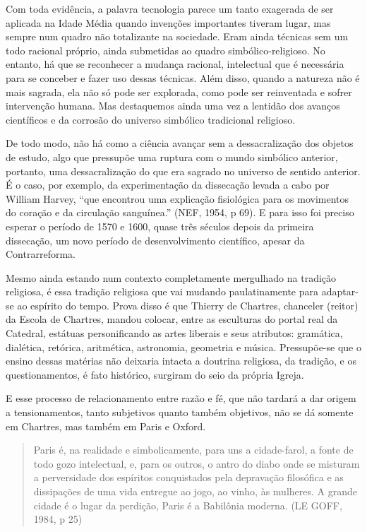 Com toda evidência, a palavra tecnologia parece um tanto exagerada de
ser aplicada na Idade Média quando invenções importantes tiveram lugar,
mas sempre num quadro não totalizante na sociedade. Eram ainda técnicas
sem um todo racional próprio, ainda submetidas ao quadro
simbólico-religioso. No entanto, há que se reconhecer a mudança
racional, intelectual que é necessária para se conceber e fazer uso
dessas técnicas. Além disso, quando a natureza não é mais sagrada, ela
não só pode ser explorada, como pode ser reinventada e sofrer
intervenção humana. Mas destaquemos ainda uma vez a lentidão dos avanços
científicos e da corrosão do universo simbólico tradicional religioso.

De todo modo, não há como a ciência avançar sem a dessacralização dos
objetos de estudo, algo que pressupõe uma ruptura com o mundo simbólico
anterior, portanto, uma dessacralização do que era sagrado no universo
de sentido anterior. É o caso, por exemplo, da experimentação da
dissecação levada a cabo por William Harvey, ``que encontrou uma
explicação fisiológica para os movimentos do coração e da circulação
sanguínea.'' (NEF, 1954, p 69). E para isso foi preciso esperar o
período de 1570 e 1600, quase três séculos depois da primeira
dissecação, um novo período de desenvolvimento científico, apesar da
Contrarreforma.

Mesmo ainda estando num contexto completamente mergulhado na tradição
religiosa, é essa tradição religiosa que vai mudando paulatinamente para
adaptar-se ao espírito do tempo. Prova disso é que Thierry de Chartres,
chanceler (reitor) da Escola de Chartres, mandou colocar, entre as
esculturas do portal real da Catedral, estátuas personificando as artes
liberais e seus atributos: gramática, dialética, retórica, aritmética,
astronomia, geometria e música. Pressupõe-se que o ensino dessas
matérias não deixaria intacta a doutrina religiosa, da tradição, e os
questionamentos, é fato histórico, surgiram do seio da própria Igreja.

E esse processo de relacionamento entre razão e fé, que não tardará a
dar origem a tensionamentos, tanto subjetivos quanto também objetivos,
não se dá somente em Chartres, mas também em Paris e Oxford.

\begin{quote}
Paris é, na realidade e simbolicamente, para uns a cidade-farol, a fonte
de todo gozo intelectual, e, para os outros, o antro do diabo onde se
misturam a perversidade dos espíritos conquistados pela depravação
filosófica e as dissipações de uma vida entregue ao jogo, ao vinho, às
mulheres. A grande cidade é o lugar da perdição, Paris é a Babilônia
moderna. (LE GOFF, 1984, p 25)
\end{quote}

